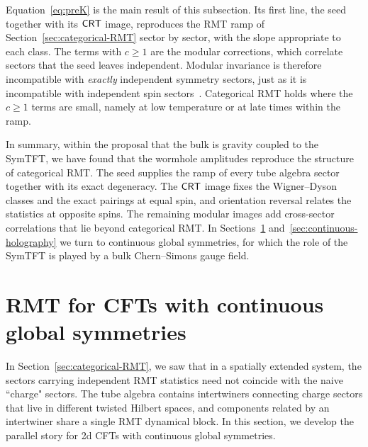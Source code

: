 \documentclass[11pt]{article}
\numberwithin{equation}{section}
\begin{document}
Equation~\eqref{eq:preK} is the main result of this subsection. Its first line, the seed together with its $\mathsf{CRT}$ image, reproduces the RMT ramp of Section~\ref{sec:categorical-RMT} sector by sector, with the slope appropriate to each class. The terms with $c\ge1$ are the modular corrections, which correlate sectors that the seed leaves independent. Modular invariance is therefore incompatible with \emph{exactly} independent symmetry sectors, just as it is incompatible with independent spin sectors~\cite{Haehl:2023mhf,DiUbaldo:2023qli}. Categorical RMT holds where the $c\ge1$ terms are small, namely at low temperature or at late times within the ramp.

In summary, within the proposal that the bulk is gravity coupled to the SymTFT, we have found that the wormhole amplitudes reproduce the structure of categorical RMT. The seed supplies the ramp of every tube algebra sector together with its exact degeneracy. The $\mathsf{CRT}$ image fixes the Wigner--Dyson classes and the exact pairings at equal spin, and orientation reversal relates the statistics at opposite spins. The remaining modular images add cross-sector correlations that lie beyond categorical RMT. In Sections~\ref{sec:continuous-CFT} and~\ref{sec:continuous-holography} we turn to continuous global symmetries, for which the role of the SymTFT is played by a bulk Chern--Simons gauge field.


\section{RMT for CFTs with continuous global symmetries}
\label{sec:continuous-CFT}

In Section~\ref{sec:categorical-RMT}, we saw that in a spatially extended system, the sectors carrying independent RMT statistics need not coincide with the naive ``charge" sectors. The tube algebra contains intertwiners connecting charge sectors that live in different twisted Hilbert spaces, and components related by an intertwiner share a single RMT dynamical block. In this section, we develop the parallel story for 2d CFTs with continuous global symmetries.
\end{document}
